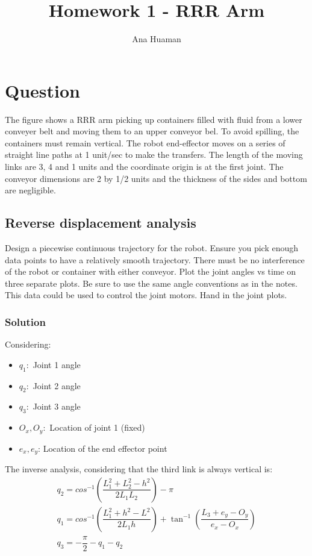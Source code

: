\documentclass[10pt,a4paper]{article}
\author{Ana Huaman}
\title{ \vspace{-10ex}Homework 1 - RRR Arm}
\begin{document}
\maketitle

\section{Question}
The figure shows a RRR arm picking up containers filled with fluid from a lower conveyer belt and moving them to an upper conveyor bel. To avoid spilling, the containers must remain vertical. The robot end-effector moves on a series of straight line paths at 1 unit/sec to make the transfers. The length of the moving links are 3, 4 and 1 units and the coordinate origin is at the first joint. The conveyor dimensions are 2 by 1/2 units and the thickness of the sides and bottom are negligible.

\subsection{ Reverse displacement analysis}
Design a piecewise continuous trajectory for the robot. Ensure you pick enough data points to have a relatively smooth trajectory. There must be no interference of the robot or container with either conveyor. Plot the joint angles vs time on three separate plots. Be sure to use the same angle conventions as in the notes. This data could be used to control the joint motors. Hand in the joint plots.

\subsubsection*{Solution}
Considering:
\begin{itemize}
\item{ $q_{1}:$ Joint 1 angle }
\item{ $q_{2}:$ Joint 2 angle }
\item{ $q_{3}:$ Joint 3 angle }
\item{ $O_{x}, O_{y}:$ Location of joint 1 (fixed) }
\item{ $e_{x}, e_{y}$: Location of the end effector point}
\end{itemize}

The inverse analysis, considering that the third link is always vertical is:
\[ \begin{matrix}
 q_{2} = cos^{-1} \left(  \dfrac{ L_{1}^{2} + L_{2}^{2} - h^{2}}{2L_{1}L_{2}} \right) - \pi  \\
q_{1} = cos^{-1} \left(  \dfrac{ L_{1}^{2} + h^{2} - L^{2}}{2L_{1}h} \right) + \tan^{-1} \left( \dfrac{L_{3} + e_{y} - O_{y}}{e_{x} - O_{x}}\right)  \\
q_{3} = -\dfrac{\pi}{2} - q_{1} - q_{2} 
\end{matrix} \]
\end{document}
